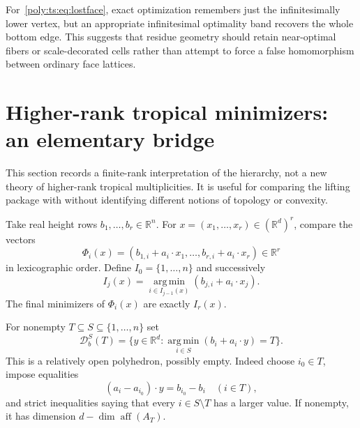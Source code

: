 \documentclass[11pt,a4paper]{article}
\numberwithin{equation}{section}
\theoremstyle{plain}
\newcommand{\R}{\mathbb R}
\newcommand{\aff}{\operatorname{aff}}
\newcommand{\cD}{\mathcal D}
\begin{document}
For~\eqref{poly:ts:eq:lostface}, exact optimization remembers just the infinitesimally
lower vertex, but an appropriate infinitesimal optimality band recovers
the whole bottom edge. This suggests that residue geometry should retain
near-optimal fibers or scale-decorated cells rather than attempt to force
a false homomorphism between ordinary face lattices.

\section{Higher-rank tropical minimizers: an elementary bridge}
\label{poly:sec:tropical}

This section records a finite-rank interpretation of the hierarchy, not a
new theory of higher-rank tropical multiplicities. It is useful for comparing
the lifting package with \cite{fs:JS,fs:CCFL} without identifying different
notions of topology or convexity.

Take real height rows $b_1,\ldots,b_r\in\R^n$. For
$x=(x_1,\ldots,x_r)\in(\R^d)^r$, compare the vectors
\[
 \Phi_i(x)=
 (b_{1,i}+a_i\cdot x_1,\ldots,b_{r,i}+a_i\cdot x_r)
 \in\R^r
\]
in lexicographic order. Define $I_0=\{1,\ldots,n\}$ and successively
\begin{equation}\label{poly:eq:nestedmin}
 I_j(x)=\operatorname*{arg\,min}_{i\in I_{j-1}(x)}
                 (b_{j,i}+a_i\cdot x_j).
\end{equation}
The final minimizers of $\Phi_i(x)$ are exactly $I_r(x)$.

For nonempty $T\subseteq S\subseteq\{1,\ldots,n\}$ set
\[
 \cD_b^S(T)=\{y\in\R^d:
       \operatorname*{arg\,min}_{i\in S}(b_i+a_i\cdot y)=T\}.
\]
This is a relatively open polyhedron, possibly empty. Indeed choose
$i_0\in T$, impose equalities
\[
 (a_i-a_{i_0})\cdot y=b_{i_0}-b_i\quad(i\in T),
\]
and strict inequalities saying that every $i\in S\setminus T$ has a
larger value. If nonempty, it has dimension $d-\dim\aff(A_T)$.
\end{document}
